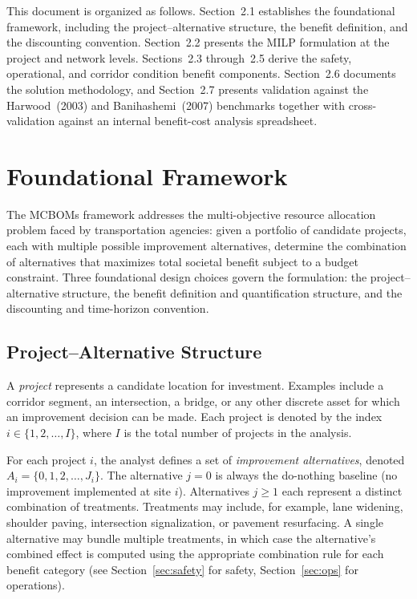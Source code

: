 This document is organized as follows. Section~2.1 establishes the
foundational framework, including the project--alternative structure, the
benefit definition, and the discounting convention. Section~2.2 presents
the MILP formulation at the project and network levels. Sections~2.3
through~2.5 derive the safety, operational, and corridor condition benefit
components. Section~2.6 documents the solution methodology, and Section~2.7
presents validation against the Harwood~(2003) and Banihashemi~(2007)
benchmarks together with cross-validation against an internal benefit-cost
analysis spreadsheet.

\setcounter{section}{0}
\section{Foundational Framework}

The MCBOMs framework addresses the multi-objective resource allocation problem
faced by transportation agencies: given a portfolio of candidate projects, each
with multiple possible improvement alternatives, determine the combination of
alternatives that maximizes total societal benefit subject to a budget
constraint. Three foundational design choices govern the formulation: the
project--alternative structure, the benefit definition and quantification
structure, and the discounting and time-horizon convention.

\subsection{Project--Alternative Structure}

A \emph{project} represents a candidate location for investment. Examples
include a corridor segment, an intersection, a bridge, or any other discrete
asset for which an improvement decision can be made. Each project is denoted by
the index $i \in \{1, 2, \ldots, I\}$, where $I$ is the total number of
projects in the analysis.

For each project $i$, the analyst defines a set of \emph{improvement
alternatives}, denoted $A_i = \{0, 1, 2, \ldots, J_i\}$. The alternative
$j = 0$ is always the do-nothing baseline (no improvement implemented at site
$i$). Alternatives $j \geq 1$ each represent a distinct combination of
treatments. Treatments may include, for example, lane widening, shoulder paving,
intersection signalization, or pavement resurfacing. A single alternative may
bundle multiple treatments, in which case the alternative's combined effect is
computed using the appropriate combination rule for each benefit category (see
Section~\ref{sec:safety} for safety, Section~\ref{sec:ops} for operations).

